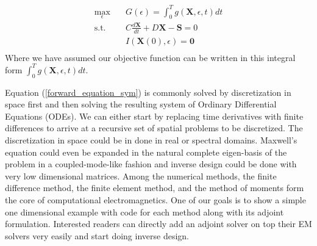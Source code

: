 \documentclass{tufte-handout}
\begin{document}
  \begin{equation}\label{opt_problem}
  \begin{aligned}
  \max_{\epsilon} \quad & G(\epsilon) = \int^T_0 g(\mathbf{X},\epsilon,t) dt \\
  \textrm{s.t.} \quad & C \frac{d \mathbf{X}}{dt} + D \mathbf{X} - \mathbf{S} = 0\\
  &I(\mathbf{X}(0),\epsilon) = \mathbf{0}   \\
  \end{aligned}
  \end{equation}
 Where we have assumed our objective function can be written in this integral form $\int^T_0 g(\mathbf{X},\epsilon,t) dt$. 
 
 Equation (\ref{forward_equation_sym}) is  commonly solved by discretization  in space first and then solving the resulting system of Ordinary Differential Equations (ODEs). We can either start by replacing time derivatives with finite differences to arrive at a recursive set of spatial problems to be discretized. The discretization in space could be in done in real or spectral domains. Maxwell's equation could even be expanded in the natural complete eigen-basis of the problem in a coupled-mode-like fashion and inverse design could be done with very low dimensional matrices.   Among the numerical methods, the finite difference method, the finite element
 method, and the method of moments form the core of computational electromagnetics. One of our goals is to show a simple one dimensional example with code for each method  along with its adjoint formulation. Interested readers can directly add an adjoint solver on top their EM solvers very easily and start doing inverse design. 
\end{document}
